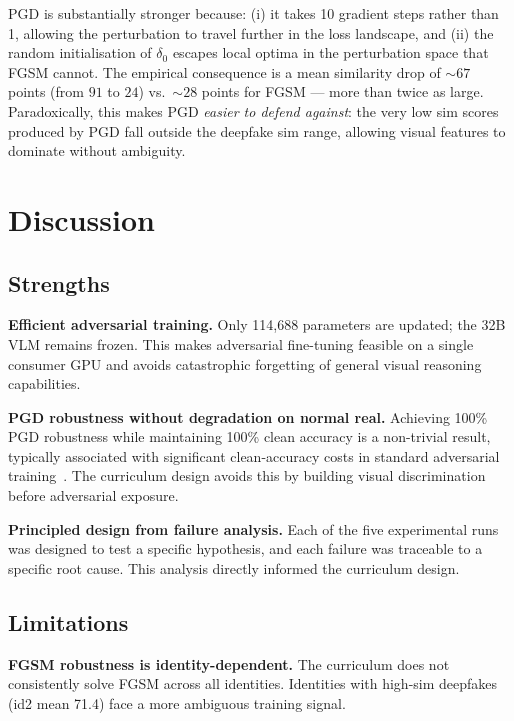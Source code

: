 \documentclass[12pt,a4paper]{article}
\begin{document}
PGD is substantially stronger because: (i) it takes 10 gradient steps rather
than 1, allowing the perturbation to travel further in the loss landscape, and
(ii) the random initialisation of $\delta_0$ escapes local optima in the
perturbation space that FGSM cannot.  The empirical consequence is a mean
similarity drop of $\sim\!67$ points (from $91$ to $24$) vs.\ $\sim\!28$ points
for FGSM --- more than twice as large.  Paradoxically, this makes PGD
\emph{easier to defend against}: the very low sim scores produced by PGD fall
outside the deepfake sim range, allowing visual features to dominate without
ambiguity.

\section{Discussion}

\subsection{Strengths}

\textbf{Efficient adversarial training.}  Only 114,688 parameters are updated;
the 32B VLM remains frozen.  This makes adversarial fine-tuning feasible on a
single consumer GPU and avoids catastrophic forgetting of general visual
reasoning capabilities.

\textbf{PGD robustness without degradation on normal real.}  Achieving 100\%
PGD robustness while maintaining 100\% clean accuracy is a non-trivial result,
typically associated with significant clean-accuracy costs in standard adversarial
training~\cite{zhang2019theoretically}.  The curriculum design avoids this
by building visual discrimination before adversarial exposure.

\textbf{Principled design from failure analysis.}  Each of the five experimental
runs was designed to test a specific hypothesis, and each failure was traceable
to a specific root cause.  This analysis directly informed the curriculum design.

\subsection{Limitations}

\textbf{FGSM robustness is identity-dependent.}  The curriculum does not
consistently solve FGSM across all identities.  Identities with high-sim
deepfakes (id2 mean 71.4) face a more ambiguous training signal.
\end{document}

